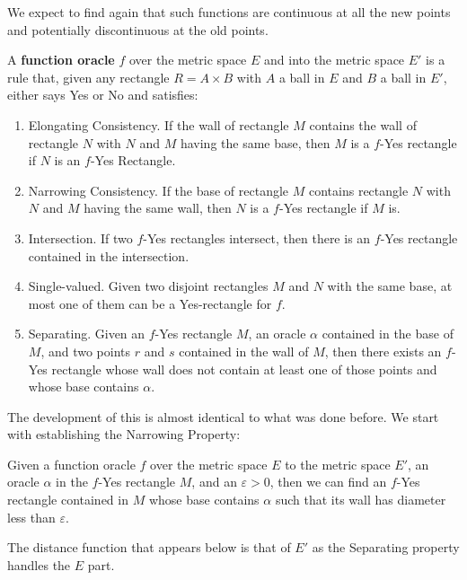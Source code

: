 \documentclass[12pt]{article}
\begin{document}
We expect to find again that such functions are continuous at all the new points and potentially discontinuous at the old points. 


A \textbf{function oracle} $f$ over the metric space $E$ and into the metric space $E'$ is a rule that, given any rectangle $R= A \times B$ with $A$ a ball in $E$ and $B$ a ball in  $E'$, either says Yes or No and satisfies: 
\begin{enumerate}
    \item Elongating Consistency. If the wall of rectangle $M$ contains the wall of rectangle $N$ with $N$ and $M$ having the same base,  then $M$ is a $f$-Yes rectangle if $N$  is an $f$-Yes Rectangle. 
    \item Narrowing Consistency. If the base of rectangle $M$ contains rectangle $N$ with $N$ and $M$ having the same wall, then $N$ is a $f$-Yes rectangle if $M$ is. 
    \item Intersection. If two $f$-Yes rectangles intersect, then there is an $f$-Yes rectangle contained in the intersection. 
    \item Single-valued. Given two disjoint rectangles $M$ and $N$ with the same base, at most one of them can be a Yes-rectangle for $f$. 
    \item Separating. Given an $f$-Yes rectangle $M$, an oracle $\alpha$ contained in the base of $M$, and two points $r$ and $s$ contained in the wall of $M$, then there exists an $f$-Yes rectangle whose wall does not contain at least one of those points and whose base contains $\alpha$.
\end{enumerate} 

The development of this is almost identical to what was done before. We start with establishing the Narrowing Property: 

\begin{proposition}\label{pr:metricfshrink}
Given a function oracle $f$ over the metric space $E$ to the metric space $E'$, an oracle $\alpha$ in the $f$-Yes rectangle $M$, and an $\varepsilon > 0$, then we can find an $f$-Yes rectangle contained in $M$ whose base contains $\alpha$ such that its wall has diameter less than $\varepsilon$.
\end{proposition}

The distance function that appears below is that of $E'$ as the Separating property handles the $E$ part. 
\end{document}
